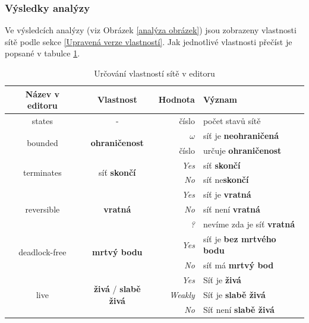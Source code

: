 \documentclass[
  biblatex,
  glossaries,
]{kidiplom}
\begin{document}
\subsubsection{Výsledky analýzy}\label{výsledky analýzy}

Ve výsledcích analýzy (viz Obrázek \ref{analýza obrázek}) jsou zobrazeny vlastnosti sítě podle sekce \ref{Upravená verze vlastností}.
Jak jednotlivé vlastnosti přečíst je popsané v tabulce \ref{vlastnosti site v editoru}.

\begin{table}[h]
  \centering
  \begin{tabular}{| c | c | r l |}
  \hline
    Název v editoru & Vlastnost & Hodnota & Význam \\
    \hline
    \hline
     states & - & číslo & počet stavů sítě \\ 
    \hline
    \multirow{2}{*}{bounded} & \multirow{2}{*}{\textbf{ohraničenost}} & \textit{$\omega$} &  síť je \textbf{neohraničená} \\ 
    &                   & číslo & určuje \textbf{ohraničenost} \\ 
    \hline
\multirow{2}{*}{terminates} & \multirow{2}{*}{síť \textbf{skončí}} & \textit{Yes} & síť \textbf{skončí} \\ 
    &                   & \textit{No} & síť ne\textbf{skončí} \\ 
    \hline
\multirow{3}{*}{reversible} & \multirow{3}{*}{\textbf{vratná}} & \textit{Yes} & síť je \textbf{vratná} \\ 
    &                   &   \textit{No} & síť není \textbf{vratná}  \\
    &                   & \textit{?} & nevíme zda je síť \textbf{vratná} \\ 
    \hline
\multirow{2}{*}{deadlock-free} & \multirow{2}{*}{\textbf{mrtvý bodu}} & \textit{Yes} & síť je \textbf{bez mrtvého bodu} \\ 
    &                   &  \textit{No} & síť má \textbf{mrtvý bod}  \\ 
    \hline
\multirow{3}{*}{live} & \multirow{3}{*}{\textbf{živá} / \textbf{slabě živá}} 
                         & \textit{Yes} & Síť je \textbf{živá} \\ 
    &                   & \textit{Weakly}  & Síť je \textbf{slabě živá} \\ 
    &                   & \textit{No} & Síť není \textbf{slabě živá} \\ 
    \hline

  \end{tabular}
  \caption{Určování vlastností sítě v editoru}\label{vlastnosti site v editoru}  
\end{table}
\end{document}
